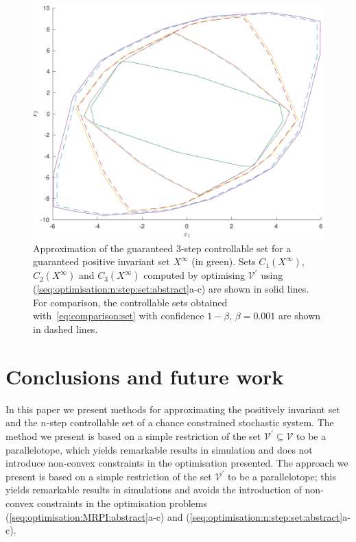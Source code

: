 \documentclass{ifacconf}
\providecommand{\V}{\mathcal V}
\providecommand{\T}{\mathcal T}
\begin{document}
\begin{figure}
\includegraphics[width=.95\linewidth]{NStepSetOptimised.pdf}
\caption{Approximation of the guaranteed 3-step controllable set for a guaranteed positive invariant set $X^\infty$ (\textcolor[rgb]{0.4667,0.6745,0.1882}{in green}). 
Sets $C_1(X^\infty)$, $C_2(X^\infty)$ and $C_3(X^\infty)$ computed by optimising $\V^\prime$ using  (\ref{seq:optimisation:n:step:set:abstract}a-c) are shown in solid lines. For comparison, the controllable sets obtained with~\eqref{eq:comparison:set} with 
confidence $1-\beta$, $\beta = 0.001$ are shown in dashed lines.}
\label{fig:n:step:controllable:set}
\vspace{4mm}\end{figure}



\section{Conclusions and future work}\label{sec:conclusion}
%
%
In this paper we present methods for approximating the positively invariant set and the $n$-step controllable set of a chance constrained stochastic system.
%
The method we present is based on a simple restriction of the set $\V^\prime\subseteq\V$ to be a parallelotope, which yields remarkable results in simulation and does not introduce non-convex constraints in the optimisation presented.
%
The approach we present is based on a simple restriction of the set $\V^\prime$ to be a parallelotope; this yields remarkable results in simulations and avoids the introduction of non-convex constraints in the optimisation problems (\ref{seq:optimisation:MRPI:abstract}a-c) and \mbox{(\ref{seq:optimisation:n:step:set:abstract}a-c)}.
\end{document}
